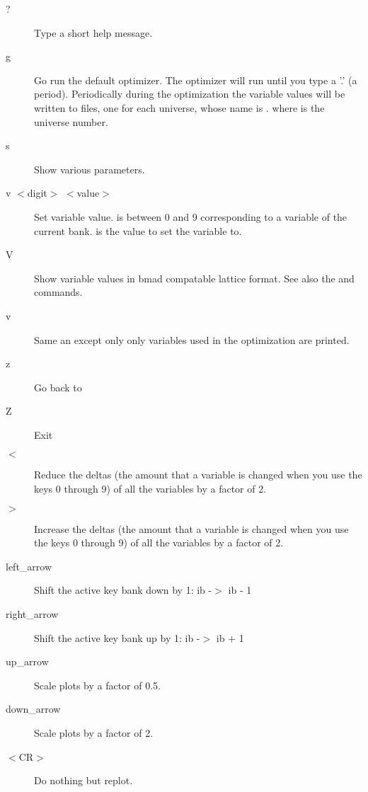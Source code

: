 \begin{description}
\item[?]
Type a short help message.

\item[g]
Go run the default optimizer. The optimizer will run until you type a
'.' (a period).  Periodically during the optimization the variable
values will be written to files, one for each universe, whose name is
. where \vn{\#} is the universe number.

\item[s]  
Show various parameters.

\item[v $<$digit$>$ $<$value$>$]
Set variable value.  is between 0 and 9 corresponding to a
variable of the current bank.  is the value to set the
variable to.

\item[V]
Show variable values in bmad compatable lattice format. See also the
 and  commands.

\item[\W v] 
Same an  except only only variables used in the optimization are printed.
\item[z] 
Go back to 

\item[Z] 
Exit \tao
                                        
\item[$<$]
Reduce the deltas (the amount that a variable is changed when you use
the keys 0 through 9) of all the variables by a factor of 2.

\item[$>$]
Increase the deltas (the amount that a variable is changed when you
use the keys 0 through 9) of all the variables by a factor of 2.

\item[left\_arrow]
Shift the active key bank down by 1: ib -$>$ ib - 1

\item[right\_arrow]
Shift the active key bank up by 1: ib -$>$ ib + 1

\item[up\_arrow]
Scale plots by a factor of 0.5.

\item[down\_arrow]
Scale plots by a factor of 2.

\item[$<$CR$>$]
Do nothing but replot.


\end{description}
